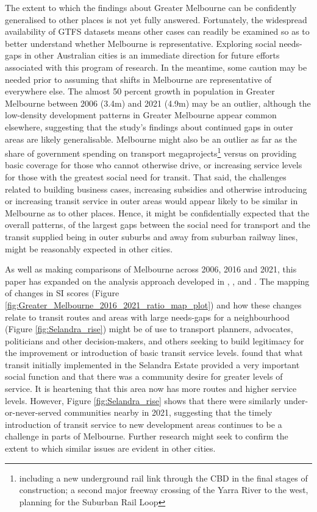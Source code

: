 \documentclass[preprint, 3p,
authoryear]{elsarticle} %
\begin{document}
The extent to which the findings about Greater Melbourne can be
confidently generalised to other places is not yet fully answered.
Fortunately, the widespread availability of GTFS datasets means other
cases can readily be examined so as to better understand whether
Melbourne is representative. Exploring social needs-gaps in other
Australian cities is an immediate direction for future efforts
associated with this program of research. In the meantime, some caution
may be needed prior to assuming that shifts in Melbourne are
representative of everywhere else. The almost 50 percent growth in
population in Greater Melbourne between 2006 (3.4m) and 2021 (4.9m) may
be an outlier, although the low-density development patterns in Greater
Melbourne appear common elsewhere, suggesting that the study's findings
about continued gaps in outer areas are likely generalisable. Melbourne
might also be an outlier as far as the share of government spending on
transport megaprojects\footnote{including a new underground rail link
  through the CBD in the final stages of construction; a second major
  freeway crossing of the Yarra River to the west, planning for the
  Suburban Rail Loop} versus on providing basic coverage for those who
cannot otherwise drive, or increasing service levels for those with the
greatest social need for transit. That said, the challenges related to
building business cases, increasing subsidies and otherwise introducing
or increasing transit service in outer areas would appear likely to be
similar in Melbourne as to other places. Hence, it might be
confidentially expected that the overall patterns, of the largest gaps
between the social need for transport and the transit supplied being in
outer suburbs and away from suburban railway lines, might be reasonably
expected in other cities.

As well as making comparisons of Melbourne across 2006, 2016 and 2021,
this paper has expanded on the analysis approach developed in
\citet{Currie2003Hobart}, \citet{Currie2004Gap},
\citet{Currie2007Identifying} and \citet{currie2010identifying}. The
mapping of changes in SI scores (Figure
\ref{fig:Greater_Melbourne_2016_2021_ratio_map_plot}) and how these
changes relate to transit routes and areas with large needs-gaps for a
neighbourhood (Figure \ref{fig:Selandra_rise}) might be of use to
transport planners, advocates, politicians and other decision-makers,
and others seeking to build legitimacy for the improvement or
introduction of basic transit service levels. \citet{delbosc2015impact}
found that what transit initially implemented in the Selandra Estate
provided a very important social function and that there was a community
desire for greater levels of service. It is heartening that this area
now has more routes and higher service levels. However, Figure
\ref{fig:Selandra_rise} shows that there were similarly
under-or-never-served communities nearby in 2021, suggesting that the
timely introduction of transit service to new development areas
continues to be a challenge in parts of Melbourne. Further research
might seek to confirm the extent to which similar issues are evident in
other cities.
\end{document}
